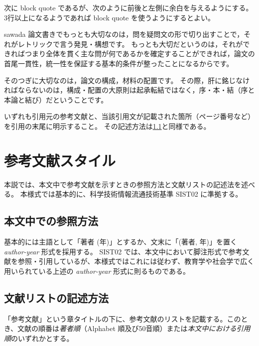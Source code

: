 			\noindent
			次に block quote であるが、次のように前後と左側に余白を与えるようにする。
			3行以上になるようであれば block quote を使うようにするとよい。

			\begin{displaycquote}[p. 74]{sawada}
				論文書きでもっとも大切なのは，問を疑問文の形で切り出すことで，それがレトリックで言う発見・構想です。
				もっとも大切だというのは，それができればつまり全体を貫く主な問が何であるかを確定することができれば，論文の首尾一貫性，統一性を保証する基本的条件が整ったことになるからです。

				そのつぎに大切なのは，論文の構成，材料の配置です。
				その際，肝に銘じなければならないのは，構成・配置の大原則は起承転結ではなく，序・本・結（序と本論と結び）だということです。
			\end{displaycquote}

			\noindent
			いずれも引用元の参考文献と、当該引用文が記載された箇所（ページ番号など）を引用の末尾に明示すること。
			その記述方法は\cref{sub:ref_style}と同様である。


	\section{参考文献スタイル}
		\label{sec:bib_style}

		本説では、本文中で参考文献を示すときの参照方法と文献リストの記述法を述べる。
		本様式では基本的に、科学技術情報流通技術基準 SIST02 に準拠する。

		\subsection{本文中での参照方法}
			\label{sub:ref_style}

			基本的には主語として「著者 (年)」とするか、文末に「(著者, 年)」を置く \emph{author-year} 形式を採用する。
			SIST02 では、本文中において脚注形式で参考文献を参照・引用しているが、本様式ではこれには従わず、教育学や社会学で広く用いられている上述の \emph{author-year} 形式に則るものである。

		\subsection{文献リストの記述方法}
			\label{sub:ref_list_sylte}

			「参考文献」という章タイトルの下に、参考文献のリストを記載する。このとき、文献の順番は\emph{著者順}（Alphabet 順及び50音順）または\emph{本文中における引用順}のいずれかとする。

